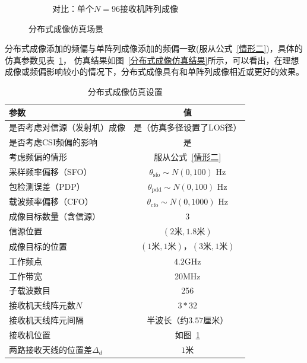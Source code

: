 \begin{figure}[H]
\begin{subfigure}[t]{.45\linewidth}
    \caption{对比：单个$N=96$接收机阵列成像}
  \end{subfigure}
  \caption{分布式成像仿真场景}
  \label{分布式成像仿真场景}
\end{figure}
分布式成像添加的频偏与单阵列成像添加的频偏一致(服从公式~\eqref{情形二})，具体的仿真参数见表~\ref{分布式成像仿真设置}，
仿真结果如图~\ref{分布式成像仿真结果}所示，可以看出，在理想成像或频偏影响较小的情况下，分布式成像具有和单阵列成像相近或更好的效果。
\begin{table}[htb]
      \begin{center}
          \caption{分布式成像仿真设置}\label{分布式成像仿真设置}
          \begin{tabular}{lc} %
              \toprule
              参数 & 值 \\
              \midrule
              是否考虑对信源（发射机）成像 & 是（仿真多径设置了LOS径）\\
              是否考虑CSI频偏的影响 & 是\\
              考虑频偏的情形  & 服从公式~\eqref{情形二}\\
              采样频率偏移（SFO）   &   $\theta_{\text{sfo}}\sim N(0,100)$ Hz\\
              包检测误差（PDP）     &   $\theta_{\text{pdd}}\sim N(0,100)$ Hz\\
              载波频率偏移（CFO）   &   $\theta_{\text{cfo}}\sim N(0,1000)$ Hz\\
              成像目标数量（含信源）    & 3\\
              信源位置        &  $(2\text{米},1.8\text{米})$ \\
              成像目标的位置  & $(1\text{米},1\text{米})$，$(3\text{米},1\text{米})$ \\
              工作频点        & $4.2$GHz\\
              工作带宽      & 20MHz \\
              子载波数目      & 256\\
              接收机天线阵元数$N$      & $3*32$\\
              接收机天线阵元间隔    & 半波长（约$3.57$厘米）\\
              接收机位置           & 如图~\ref{分布式成像仿真场景}\\
              两路接收天线的位置差$\Delta_d$ & $1$米\\
              \bottomrule
          \end{tabular}
      \end{center}
\end{table}

